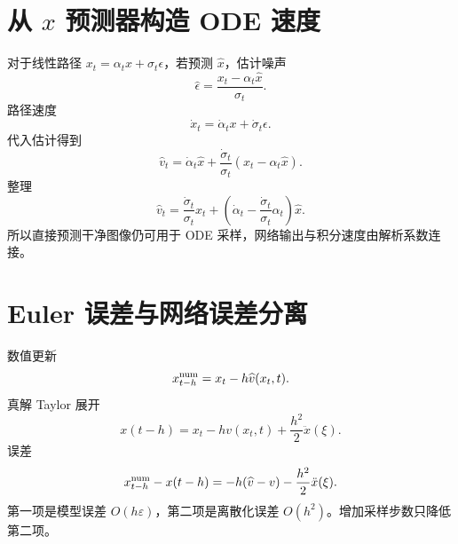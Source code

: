 \documentclass[UTF8,12pt,a4paper,fontset=none]{ctexart}
\numberwithin{equation}{section}
\begin{document}
\section{从 $x$ 预测器构造 ODE 速度}
对于线性路径 $x_t=\alpha_tx+\sigma_t\epsilon$，若预测 $\widehat x$，估计噪声
\begin{equation}
 \widehat\epsilon=\frac{x_t-\alpha_t\widehat x}{\sigma_t}.
\end{equation}
路径速度
\begin{equation}
 \dot x_t=\dot\alpha_t x+\dot\sigma_t\epsilon.
\end{equation}
代入估计得到
\begin{equation}
 \widehat v_t=
 \dot\alpha_t\widehat x+
 \frac{\dot\sigma_t}{\sigma_t}
 (x_t-\alpha_t\widehat x).
\end{equation}
整理
\begin{equation}
 \widehat v_t=
 \frac{\dot\sigma_t}{\sigma_t}x_t+
 \left(\dot\alpha_t-
 \frac{\dot\sigma_t}{\sigma_t}\alpha_t\right)\widehat x.
\end{equation}
所以直接预测干净图像仍可用于 ODE 采样，网络输出与积分速度由解析系数连接。

\section{Euler 误差与网络误差分离}
数值更新
\begin{equation}
 x_{t-h}^{\rm num}=x_t-h\widehat v(x_t,t).
\end{equation}
真解 Taylor 展开
\begin{equation}
 x(t-h)=x_t-hv(x_t,t)+\frac{h^2}{2}\ddot x(\xi).
\end{equation}
误差
\begin{equation}
 x_{t-h}^{\rm num}-x(t-h)
 =-h(\widehat v-v)-\frac{h^2}{2}\ddot x(\xi).
\end{equation}
第一项是模型误差 $O(h\varepsilon)$，第二项是离散化误差 $O(h^2)$。增加采样步数只降低第二项。
\end{document}
